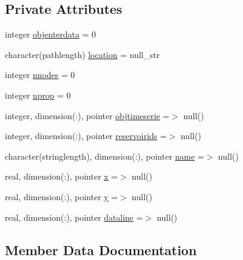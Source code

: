\subsection*{Private Attributes}
\begin{DoxyCompactItemize}
\item 
integer \mbox{\hyperlink{structmodulereservoirs_1_1t__timeserie_ac6434a9ce8512aa7ac5107e116bf3dd8}{objenterdata}} = 0
\item 
character(pathlength) \mbox{\hyperlink{structmodulereservoirs_1_1t__timeserie_adb7adcec0625a2a24cb3b9c580207b68}{location}} = null\+\_\+str
\item 
integer \mbox{\hyperlink{structmodulereservoirs_1_1t__timeserie_af1e4717283a9a50572885f83b084dfe4}{nnodes}} = 0
\item 
integer \mbox{\hyperlink{structmodulereservoirs_1_1t__timeserie_a223589e4f7adbbe80a7bc60caa13ef05}{nprop}} = 0
\item 
integer, dimension(\+:), pointer \mbox{\hyperlink{structmodulereservoirs_1_1t__timeserie_a298d6c9bce7a360ff126d7590fbc6534}{objtimeserie}} =$>$ null()
\item 
integer, dimension(\+:), pointer \mbox{\hyperlink{structmodulereservoirs_1_1t__timeserie_aa3f80ea1905a902d6755f88dff303fe5}{reservoirids}} =$>$ null()
\item 
character(stringlength), dimension(\+:), pointer \mbox{\hyperlink{structmodulereservoirs_1_1t__timeserie_a73ca1fff1d3569433a3126c07a7bd815}{name}} =$>$ null()
\item 
real, dimension(\+:), pointer \mbox{\hyperlink{structmodulereservoirs_1_1t__timeserie_a848cd1aab5abc96a9eb205579a8820e5}{x}} =$>$ null()
\item 
real, dimension(\+:), pointer \mbox{\hyperlink{structmodulereservoirs_1_1t__timeserie_a6405e2f4687d9681935985f99a9cf2ad}{y}} =$>$ null()
\item 
real, dimension(\+:), pointer \mbox{\hyperlink{structmodulereservoirs_1_1t__timeserie_a390723c0f1fdda7694437b95bfbae78f}{dataline}} =$>$ null()
\end{DoxyCompactItemize}


\subsection{Member Data Documentation}
\mbox{\label{structmodulereservoirs_1_1t__timeserie_a390723c0f1fdda7694437b95bfbae78f}} 
